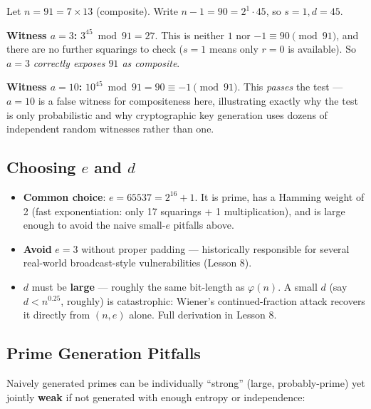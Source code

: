 \begin{example}
Let $n = 91 = 7 \times 13$ (composite). Write $n - 1 = 90 = 2^1 \cdot 45$, so $s=1, d=45$.

\textbf{Witness $a=3$:} $3^{45} \bmod 91 = 27$. This is neither $1$ nor $-1 \equiv 90 \pmod{91}$, and there are no further squarings to check ($s=1$ means only $r=0$ is available). So $a=3$ \emph{correctly exposes $91$ as composite}.

\textbf{Witness $a=10$:} $10^{45} \bmod 91 = 90 \equiv -1 \pmod{91}$. This \emph{passes} the test — $a=10$ is a false witness for compositeness here, illustrating exactly why the test is only probabilistic and why cryptographic key generation uses dozens of independent random witnesses rather than one.
\end{example}

\subsection{Choosing $e$ and $d$}

\begin{itemize}
\item \textbf{Common choice}: $e = 65537 = 2^{16}+1$. It is prime, has a Hamming weight of 2 (fast exponentiation: only 17 squarings + 1 multiplication), and is large enough to avoid the naive small-$e$ pitfalls above.
\item \textbf{Avoid} $e=3$ without proper padding — historically responsible for several real-world broadcast-style vulnerabilities (Lesson 8).
\item $d$ must be \textbf{large} — roughly the same bit-length as $\varphi(n)$. A small $d$ (say $d < n^{0.25}$, roughly) is catastrophic: Wiener's continued-fraction attack recovers it directly from $(n,e)$ alone. Full derivation in Lesson 8.
\end{itemize}

\subsection{Prime Generation Pitfalls}

Naively generated primes can be individually ``strong'' (large, probably-prime) yet jointly \textbf{weak} if not generated with enough entropy or independence:


